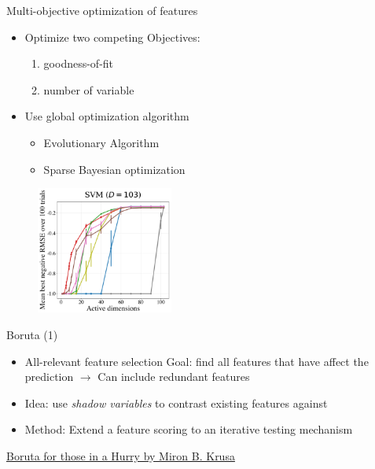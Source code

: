 \documentclass[11pt,compress,t,notes=noshow, xcolor=table]{beamer}
\begin{document}
\begin{frame}{Multi-objective optimization of features}
    \begin{itemize}
        \item Optimize two competing Objectives:
        \begin{enumerate}
            \item goodness-of-fit
            \item number of variable
        \end{enumerate}
        \item Use global optimization algorithm
        \begin{itemize}
            \item Evolutionary Algorithm
            \item Sparse Bayesian optimization
        \end{itemize}
    \end{itemize}
    \begin{figure}
        \centering
        \includegraphics[width=0.4\textwidth]{figure/liu-aistats23a.png}
    \end{figure}
\end{frame}

\begin{frame}{Boruta (1)}
    \begin{itemize}
        \item All-relevant feature selection
        \newline Goal: find all features that have affect the prediction
        \newline $\rightarrow$ Can include redundant features
        \item Idea: use \emph{shadow variables} to contrast existing features against
        \item Method: Extend a feature scoring to an iterative testing mechanism
    \end{itemize}
    \vfill
    \href{https://cran.r-project.org/web/packages/Boruta/vignettes/inahurry.pdf}{Boruta for those in a Hurry by Miron B. Krusa}
\end{frame}
\end{document}
